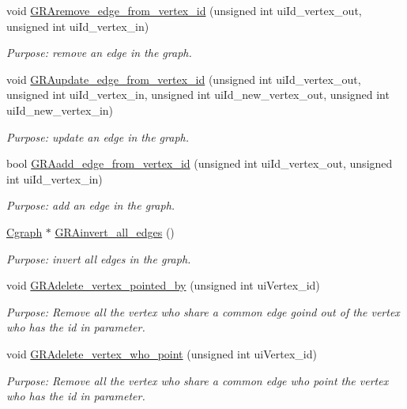 \begin{DoxyCompactItemize}
void \hyperlink{class_cgraph_af9de5664a44cdfbca02f33c9dc45c18e}{G\+R\+Aremove\+\_\+edge\+\_\+from\+\_\+vertex\+\_\+id} (unsigned int ui\+Id\+\_\+vertex\+\_\+out, unsigned int ui\+Id\+\_\+vertex\+\_\+in)
\begin{DoxyCompactList}\small\item\em Purpose\+: remove an edge in the graph. \end{DoxyCompactList}\item 
void \hyperlink{class_cgraph_aad67e71da6fa688645f7c3dfbb156c8f}{G\+R\+Aupdate\+\_\+edge\+\_\+from\+\_\+vertex\+\_\+id} (unsigned int ui\+Id\+\_\+vertex\+\_\+out, unsigned int ui\+Id\+\_\+vertex\+\_\+in, unsigned int ui\+Id\+\_\+new\+\_\+vertex\+\_\+out, unsigned int ui\+Id\+\_\+new\+\_\+vertex\+\_\+in)
\begin{DoxyCompactList}\small\item\em Purpose\+: update an edge in the graph. \end{DoxyCompactList}\item 
bool \hyperlink{class_cgraph_ab965ddccededf53171639d0d229c6b79}{G\+R\+Aadd\+\_\+edge\+\_\+from\+\_\+vertex\+\_\+id} (unsigned int ui\+Id\+\_\+vertex\+\_\+out, unsigned int ui\+Id\+\_\+vertex\+\_\+in)
\begin{DoxyCompactList}\small\item\em Purpose\+: add an edge in the graph. \end{DoxyCompactList}\item 
\hyperlink{class_cgraph}{Cgraph} $\ast$ \hyperlink{class_cgraph_a8ae7eecc9e395ed8a6a893d23244d82a}{G\+R\+Ainvert\+\_\+all\+\_\+edges} ()
\begin{DoxyCompactList}\small\item\em Purpose\+: invert all edges in the graph. \end{DoxyCompactList}\item 
void \hyperlink{class_cgraph_a153be02e272b2308fe097771f6f2ac37}{G\+R\+Adelete\+\_\+vertex\+\_\+pointed\+\_\+by} (unsigned int ui\+Vertex\+\_\+id)
\begin{DoxyCompactList}\small\item\em Purpose\+: Remove all the vertex who share a common edge goind out of the vertex who has the id in parameter. \end{DoxyCompactList}\item 
void \hyperlink{class_cgraph_ac6bbe71db254913ee34eebe42253eb41}{G\+R\+Adelete\+\_\+vertex\+\_\+who\+\_\+point} (unsigned int ui\+Vertex\+\_\+id)
\begin{DoxyCompactList}\small\item\em Purpose\+: Remove all the vertex who share a common edge who point the vertex who has the id in parameter. \end{DoxyCompactList}\item 

\end{DoxyCompactItemize}
